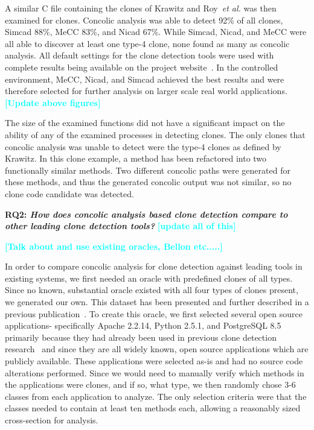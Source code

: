 \documentclass[smallextended]{svjour3}       %
\newcommand{\todo}[1]{\textcolor{cyan}{\textbf{[#1]}}}
\begin{document}
A similar C file containing the clones of Krawitz and Roy~\emph{et al.} was then examined for clones. Concolic analysis was able to detect 92\% of all clones, Simcad 88\%, MeCC 83\%, and Nicad 67\%. While Simcad, Nicad, and MeCC were all able to discover at least one type-4 clone, none found as many as concolic analysis. All default settings for the clone detection tools were used with complete results being available on the project website~\cite{cccd_url}. In the controlled environment, MeCC, Nicad, and Simcad achieved the best results and were therefore selected for further analysis on larger scale real world applications.
\todo{Update above figures}


The size of the examined functions did not have a significant impact on the ability of any of the examined processes in detecting clones. The only clones that concolic analysis was unable to detect were the type-4 clones as defined by Krawitz. In this clone example, a method has been refactored into two functionally similar methods. Two different concolic paths were generated for these methods, and thus the generated concolic output was not similar, so no clone code candidate was detected.

\textbf{RQ2: \emph{How does concolic analysis based clone detection compare to other leading clone detection tools?}}
\todo{update all of this}

\todo{Talk about and use existing oracles, Bellon etc.....}

In order to compare concolic analysis for clone detection against leading tools in existing systems, we first needed an oracle with predefined clones of all types. Since no known, substantial oracle existed with all four types of clones present, we generated our own. This dataset has been presented and further described in a previous publication~\cite{Krutz_MSR}. To create this oracle, we first selected several open source applications- specifically Apache 2.2.14, Python 2.5.1, and PostgreSQL 8.5 primarily because they had already been used in previous clone detection research~\cite{Kim:2011:MMC:1985793.1985835} and since they are all widely known, open source applications which are publicly available. These applications were selected as-is and had no source code alterations performed. Since we would need to manually verify which methods in the applications were clones, and if so, what type, we then randomly chose 3-6 classes from each application to analyze. The only selection criteria were that the classes needed to contain at least ten methods each, allowing a reasonably sized cross-section for analysis.
\end{document}

